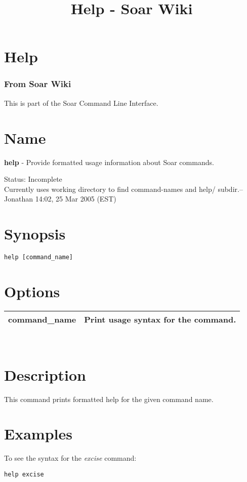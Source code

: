 \documentclass[10pt]{article}
\title{Help - Soar Wiki}
\begin{document}
\section*{Help}
\subsubsection*{From Soar Wiki}


 This is part of the Soar Command Line Interface. 
\section*{ Name }


 \textbf{help}
 - Provide formatted usage information about Soar commands. 


 Status: Incomplete\\ 
Currently uses working directory to find command-names and help/ subdir.--Jonathan 14:02, 25 Mar 2005 (EST) 
\section*{ Synopsis }
\begin{verbatim}
help [command_name]

\end{verbatim}
\section*{ Options }


\begin{tabular}{|c|c|}
\hline 
 command\_name  & Print usage syntax for the command.  \\
 \hline 

\end{tabular}



 \\ 

\section*{ Description }


 This command prints formatted help for the given command name. 
\section*{ Examples }


 To see the syntax for the \emph{excise}
 command: \begin{verbatim}
help excise

\end{verbatim}
\end{document}
